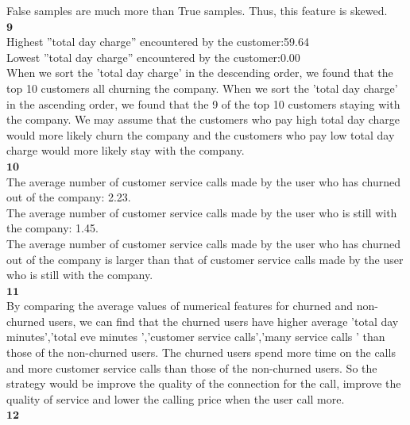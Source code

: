 \documentclass[12pt]{article}
\begin{document}
False samples are much more than True samples. Thus, this feature is skewed.\\

$\textbf{9}$\\

Highest ”total day charge” encountered by the customer:59.64\\

Lowest ”total day charge” encountered by the customer:0.00\\

When we sort the 'total day charge' in the descending order, we found that the top 10 customers all churning the company.
When we sort the 'total day charge' in the ascending order, we found that the 9 of the top 10 customers staying with the company. We may assume that the customers who pay high total day charge would more likely churn the company and the customers who pay low total day charge would more likely stay with the company.\\

$\textbf{10}$\\

The average number of customer service calls made by the user who has churned out of the company: 2.23.\\

The average number of customer service calls made by the user who is still with the company: 1.45.\\

The average number of customer service calls made by the user who has churned out of the company is larger than that of customer service calls made by the user who is still with the company.\\

$\textbf{11}$\\

By comparing the average values of numerical features for churned and non-churned users, we can find that the churned users have higher average 'total day minutes','total eve minutes ','customer service calls','many service calls ' than those of the non-churned users. The churned users spend more time on the calls and more customer service calls than those of the non-churned users. So the strategy would be improve the quality of the connection for the call, improve the quality of service and lower the calling price when the user call more.\\


$\textbf{12}$\\
\end{document}
